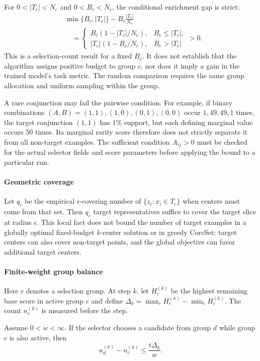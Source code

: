 For $0<|T_c|<N_c$ and $0<B_c<N_c$, the conditional enrichment gap is strict:
\begin{align*}
&\min\{B_c,|T_c|\}-B_c\frac{|T_c|}{N_c}\\
&\quad=\begin{cases}
B_c(1-|T_c|/N_c),& B_c\leq|T_c|,\\
|T_c|(1-B_c/N_c),& B_c>|T_c|
\end{cases}>0.
\end{align*}
This is a selection-count result for a fixed $B_c$. It does not establish that the algorithm assigns positive budget to group $c$, nor does it imply a gain in the trained model's task metric. The random comparison requires the same group allocation and uniform sampling within the group.

A rare conjunction may fail the pairwise condition. For example, if binary combinations $(A,B)=(1,1),(1,0),(0,1),(0,0)$ occur $1,49,49,1$ times, the target conjunction $(1,1)$ has $1\%$ support, but each defining marginal value occurs 50 times. Its marginal rarity score therefore does not strictly separate it from all non-target examples. The sufficient condition $A_{ij}>0$ must be checked for the actual selector fields and score parameters before applying the bound to a particular run.

\paragraph{Geometric coverage}
Let $q_c$ be the empirical $\epsilon$-covering number of $\{z_i:x_i\in T_c\}$ when centers must come from that set. Then $q_c$ target representatives suffice to cover the target slice at radius $\epsilon$. This local fact does not bound the number of target examples in a globally optimal fixed-budget $k$-center solution or in greedy CoreSet: target centers can also cover non-target points, and the global objective can favor additional target centers.

\paragraph{Finite-weight group balance}
Here $c$ denotes a selection group. At step $k$, let $H_c^{(k)}$ be the highest remaining base score in active group $c$ and define $\Delta_k=\max_c H_c^{(k)}-\min_c H_c^{(k)}$. The count $n_c^{(k)}$ is measured before the step.
\begin{tcolorbox}[
    colback=blue!2!white,
    colframe=blue!20!white,
    arc=3pt,
    boxrule=1pt,
    drop shadow,
    breakable
]
\begin{lemma}
\label{lem:finite-weight-balance}
Assume $0<w<\infty$. If the selector chooses a candidate from group $d$ while group $c$ is also active, then
\begin{equation}
\label{eq:finite-balance-gap}
n_d^{(k)}-n_c^{(k)}\leq\frac{t\Delta_k}{w}.
\end{equation}
\end{lemma}
\end{tcolorbox}

